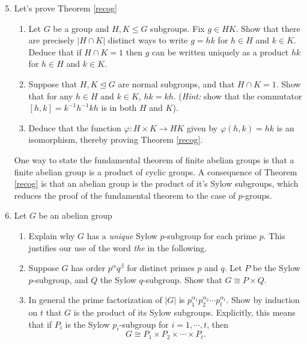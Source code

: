 \documentclass[11pt]{article}
\begin{document}
\begin{enumerate}
\setcounter{enumi}{4}
\item Let's prove Theorem \ref{recog}
\begin{enumerate}
\item Let $G$ be a group and $H,K\le G$ subgroups.  Fix $g\in HK$.  Show that there are precisely $|H\cap K|$ distinct ways to write $g = hk$ for $h\in H$ and $k\in K$.  Deduce that if $H\cap K=1$ then $g$ can be written uniquely as a product $hk$ for $h\in H$ and $k\in K$.
\item Suppose that $H,K\unlhd G$ are normal subgroups, and that $H\cap K=1$.  Show that for any $h\in H$ and $k\in K$, $hk = kh$.  (\textit{Hint:} show that the commutator $[h,k]=k^{-1}h^{-1}kh$ is in both $H$ and $K$).
\item Deduce that the function $\varphi:H\times K\to HK$ given by $\varphi(h,k) = hk$ is an isomorphism, thereby proving Theorem \ref{recog}.
\end{enumerate}
One way to state the fundamental theorem of finite abelian groups is that a finite abelian group is a product of cyclic groups.  A consequence of Theorem \ref{recog} is that an abelian group is the product of it's Sylow subgroups, which reduces the proof of the fundamental theorem to the case of $p$-groups.
\item{Let $G$ be an abelian group
\begin{enumerate}
    \item{
    Explain why $G$ has a \textit{unique} Sylow $p$-subgroup for each prime $p$.  This justifies our use of the word \textit{the} in the following.
    }
    \item{
    Suppose $G$ has order $p^\alpha q^\beta$ for distinct primes $p$ and $q$.  Let $P$ be the Sylow $p$-subgroup, and $Q$ the Sylow $q$-subgroup.  Show that $G\cong P\times Q$.
    }
    \item{
    In general the prime factorization of $|G|$ is $p_1^{\alpha_1}p_2^{\alpha_2}\cdots p_t^{\alpha_t}$.  Show by induction on $t$ that $G$ is the product of its Sylow subgroups.  Explicitly, this means that if $P_i$ is the Sylow $p_i$-subgroup for $i= 1,\cdots,t$, then
    \[G\cong P_1\times P_2\times\cdots\times P_t.\]
    }
    \end{enumerate}
   }
\end{enumerate}
\end{document}
